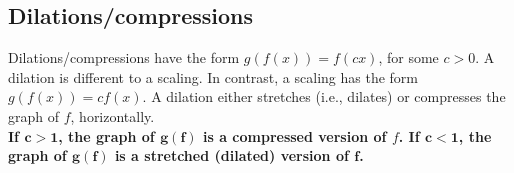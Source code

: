 \subsection{Dilations/compressions} \label{dilation/compression, functions}
Dilations/compressions have the form $g(f(x)) = f(cx)$, for some $c > 0$. A dilation is different to a scaling. In contrast, a scaling has the form $g(f(x)) = cf(x)$. A dilation either stretches (i.e., dilates) or compresses the graph of $f$, horizontally. \\

\noindent \textbf{If $\boldsymbol{c > 1}$, the graph of $\boldsymbol{g(f)}$ is a compressed version of $f$. If $\boldsymbol{c < 1}$, the graph of $\boldsymbol{g(f)}$ is a stretched (dilated) version of $\boldsymbol{f}$.} \\

